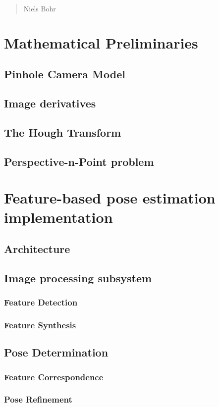 \begin{quotation}
{\footnotesize
{}
\begin{flushright}
Niels Bohr
\end{flushright}
}
\end{quotation}
\vspace{0.5cm}

\section{Mathematical Preliminaries}

\subsection{Pinhole Camera Model}

\subsection{Image derivatives}

\subsection{The Hough Transform}

\subsection{Perspective-n-Point problem}

\section{Feature-based pose estimation implementation}

\subsection{Architecture}

\subsection{Image processing subsystem}

\subsubsection{Feature Detection}

\subsubsection{Feature Synthesis}

\subsection{Pose Determination}

\subsubsection{Feature Correspondence}

\subsubsection{Pose Refinement}


